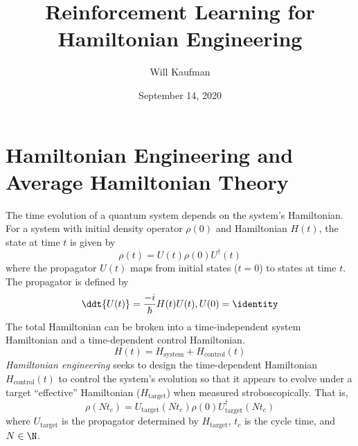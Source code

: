 \documentclass[twocolumn, aps, prd]{revtex4-2}
\begin{document}

\title{Reinforcement Learning for Hamiltonian Engineering}
\author{Will Kaufman}
\date{September 14, 2020}


\maketitle


\section{Hamiltonian Engineering and Average Hamiltonian Theory}

The time evolution of a quantum system depends on the system's Hamiltonian. For a system with initial density operator $\rho(0)$ and Hamiltonian $H(t)$, the state at time $t$ is given by
\[
\rho(t) = U(t)\rho(0)U^\dagger(t)
\]
where the propagator $U(t)$ maps from initial states ($t=0$) to states at time $t$. The propagator is defined by
\begin{equation}
    \ddt{U(t)} = \frac{-i}{\hbar} H(t) U(t), U(0) = \identity
\end{equation}
The total Hamiltonian can be broken into a time-independent system Hamiltonian and a time-dependent control Hamiltonian.
\begin{equation}
    H(t) = H_\text{system} + H_\text{control}(t)
\end{equation}
\emph{Hamiltonian engineering} seeks to design the time-dependent Hamiltonian $H_\text{control}(t)$ to control the system's evolution so that it appears to evolve under a target ``effective'' Hamiltonian ($H_\text{target}$) when measured stroboscopically. That is,
\begin{equation}\label{eq:strob_measure}
    \rho(Nt_c) = U_\text{target}(Nt_c) \rho(0) U_\text{target}^\dagger(Nt_c)
\end{equation}
where $U_\text{target}$ is the propagator determined by $H_\text{target}$, $t_c$ is the cycle time, and $N \in \N$.
\end{document}
